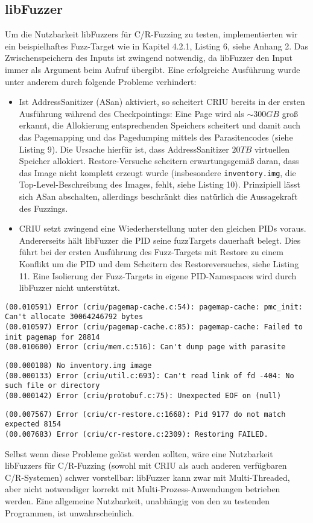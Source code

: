 \documentclass[a4paper]{article}
\begin{document}
\subsection{libFuzzer}
Um die Nutzbarkeit libFuzzers für C/R-Fuzzing zu testen, implementierten wir ein beispielhaftes Fuzz-Target wie in Kapitel 4.2.1, Listing 6, siehe Anhang 2.
Das Zwischenspeichern des Inputs ist zwingend notwendig, da libFuzzer den Input immer als Argument beim Aufruf übergibt. 
Eine erfolgreiche Ausführung wurde unter anderem durch folgende Probleme verhindert:
\begin{itemize}
    \item Ist AddressSanitizer\cite{adsan} (ASan) aktiviert, so scheitert CRIU bereits in der ersten Ausführung während des Checkpointings: Eine Page wird als $\sim 300GB$ groß erkannt, die Allokierung entsprechenden Speichers scheitert und damit auch das Pagemapping und das Pagedumping mittels des Parasitencodes (siehe Listing 9). 
        Die Ursache hierfür ist, dass AddressSanitizer $20TB$ virtuellen Speicher allokiert\cite{aflasan}. Restore-Versuche scheitern erwartungsgemäß daran, dass das Image nicht komplett erzeugt wurde (insbesondere \texttt{inventory.img}, die Top-Level-Beschreibung des Images, fehlt, siehe Listing 10).
        Prinzipiell lässt sich ASan abschalten, allerdings beschränkt dies natürlich die Aussagekraft des Fuzzings.
    \item CRIU setzt zwingend eine Wiederherstellung unter den gleichen PIDs voraus. Andererseits hält libFuzzer die PID seine fuzzTargets dauerhaft belegt. Dies führt bei der ersten Ausführung des Fuzz-Targets mit Restore zu einem Konflikt um die PID und dem Scheitern des Restoreversuches, siehe Listing 11. Eine Isolierung der Fuzz-Targets in eigene PID-Namespaces wird durch libFuzzer nicht unterstützt.
\end{itemize}
\begin{lstlisting}[caption=Pagemapping/dumping Errors mit ASan]
(00.010591) Error (criu/pagemap-cache.c:54): pagemap-cache: pmc_init: Can't allocate 30064246792 bytes
(00.010597) Error (criu/pagemap-cache.c:85): pagemap-cache: Failed to init pagemap for 28814
(00.010600) Error (criu/mem.c:516): Can't dump page with parasite
\end{lstlisting}
\begin{lstlisting}[caption=Restoring Error mit ASan]
(00.000108) No inventory.img image
(00.000133) Error (criu/util.c:693): Can't read link of fd -404: No such file or directory
(00.000142) Error (criu/protobuf.c:75): Unexpected EOF on (null)
\end{lstlisting}
\begin{lstlisting}[caption=Restoring Error durch PID mismatch]
(00.007567) Error (criu/cr-restore.c:1668): Pid 9177 do not match expected 8154
(00.007683) Error (criu/cr-restore.c:2309): Restoring FAILED.
\end{lstlisting}
Selbst wenn diese Probleme gelöst werden sollten, wäre eine Nutzbarkeit libFuzzers für C/R-Fuzzing (sowohl mit CRIU als auch anderen verfügbaren C/R-Systemen) schwer vorstellbar: libFuzzer kann zwar mit Multi-Threaded, aber nicht notwendiger korrekt mit Multi-Prozess-Anwendungen betrieben werden. Eine allgemeine Nutzbarkeit, unabhängig von den zu testenden Programmen, ist unwahrscheinlich.
\end{document}

